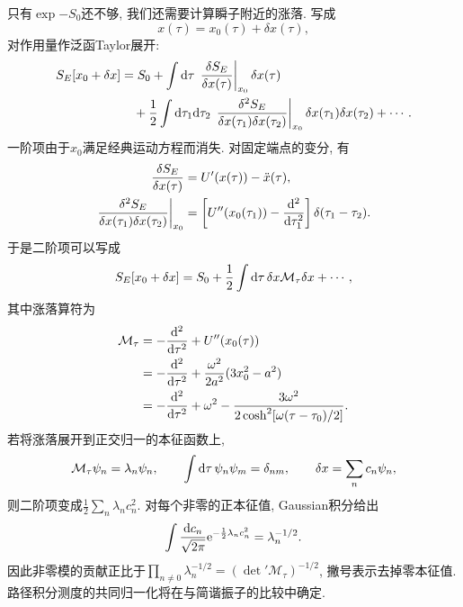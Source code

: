 
只有$\exp{-S_0}$还不够, 我们还需要计算瞬子附近的涨落. 写成
\begin{equation}
    x(\tau)=x_0(\tau)+\delta x(\tau),
\end{equation}
对作用量作泛函Taylor展开:
\begin{align}
    S_E[x_0+\delta x]
    &=S_0+\int\mathrm d\tau\,
      \left.\frac{\delta S_E}{\delta x(\tau)}\right|_{x_0}\delta x(\tau)\notag\\
    &\quad+\frac12\int\mathrm d\tau_1\mathrm d\tau_2\,
      \left.\frac{\delta^2S_E}{\delta x(\tau_1)\delta x(\tau_2)}\right|_{x_0}
      \delta x(\tau_1)\delta x(\tau_2)+\cdots.
\end{align}
一阶项由于$x_0$满足经典运动方程而消失. 对固定端点的变分, 有
\begin{align}
    \frac{\delta S_E}{\delta x(\tau)}
    &=U'(x(\tau))-\ddot x(\tau),\\
    \left.\frac{\delta^2S_E}{\delta x(\tau_1)\delta x(\tau_2)}\right|_{x_0}
    &=\left[U''(x_0(\tau_1))-\frac{\mathrm d^2}{\mathrm d\tau_1^2}\right]
      \delta(\tau_1-\tau_2).
\end{align}
于是二阶项可以写成
\begin{equation}\label{ssb-quadratic-fluctuation}
    S_E[x_0+\delta x]
    =S_0+\frac12\int\mathrm d\tau\,\delta x\mathcal M_\tau\delta x+\cdots,
\end{equation}
其中涨落算符为
\begin{align}\label{ssb-fluctuation-operator}
    \mathcal M_\tau
    &=-\frac{\mathrm d^2}{\mathrm d\tau^2}+U''(x_0(\tau))\notag\\
    &=-\frac{\mathrm d^2}{\mathrm d\tau^2}+\frac{\omega^2}{2a^2}(3x_0^2-a^2)\notag\\
    &=-\frac{\mathrm d^2}{\mathrm d\tau^2}+\omega^2
      -\frac{3\omega^2}{2\cosh^2[\omega(\tau-\tau_0)/2]}.
\end{align}
若将涨落展开到正交归一的本征函数上,
\begin{equation}
    \mathcal M_\tau\psi_n=\lambda_n\psi_n,\qquad
    \int\mathrm d\tau\,\psi_n\psi_m=\delta_{nm},\qquad
    \delta x=\sum_n c_n\psi_n,
\end{equation}
则二阶项变成$\frac12\sum_n\lambda_nc_n^2$. 对每个非零的正本征值, Gaussian积分给出
\begin{equation}
    \int\frac{\mathrm d c_n}{\sqrt{2\pi}}\mathrm e^{-\frac12\lambda_nc_n^2}
    =\lambda_n^{-1/2}.
\end{equation}
因此非零模的贡献正比于$\prod_{n\ne0}\lambda_n^{-1/2}=(\det'\mathcal M_\tau)^{-1/2}$, 撇号表示去掉零本征值. 路径积分测度的共同归一化将在与简谐振子的比较中确定.

